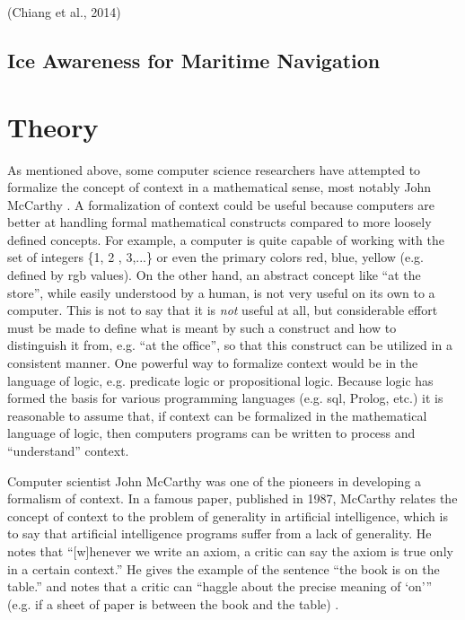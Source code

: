 (Chiang et al., 2014)%

\subsection{Ice Awareness for Maritime Navigation}
\label{sec:ice-awareness-literature}


\section{Theory}
\label{sec:theory}

As mentioned above, some computer science researchers have attempted to formalize the concept of context in a mathematical sense, most notably John McCarthy \cite{McCarthy1993} \cite{mccarthy1997formalizing} . A formalization of context could be useful because computers are better at handling formal mathematical constructs compared to more loosely defined concepts. For example, a computer is quite capable of working with the set of integers \{1, 2 , 3,...\} or even the primary colors {red, blue, yellow} (e.g. defined by \acrshort{rgb} values). On the other hand, an abstract concept like ``at the store'', while easily understood by a human, is not very useful on its own to a computer. This is not to say that it is \emph{not} useful at all, but considerable effort must be made to define what is meant by such a construct and how to distinguish it from, e.g. ``at the office'', so that this construct can be utilized in a consistent manner. One powerful way to formalize context would be in the language of logic, e.g. predicate logic or propositional logic. Because logic has formed the basis for various programming languages (e.g. \acrshort{sql}, Prolog, etc.) it is reasonable to assume that, if context can be formalized in the mathematical language of logic, then computers programs can be written to process and ``understand'' context.

Computer scientist John McCarthy was one of the pioneers in developing a formalism of context. In a famous paper, published in 1987, McCarthy relates the concept of context to the problem of generality in artificial intelligence, which is to say that artificial intelligence programs suffer from a lack of generality. He notes that ``[w]henever we write an axiom, a critic can say the axiom is true only in a certain context.'' He gives the example of the sentence ``the book is on the table.'' and notes that a critic can ``haggle about the precise meaning of `on'\thinspace'' (e.g. if a sheet of paper is between the book and the table) \cite{mccarthy1987generality}. 

